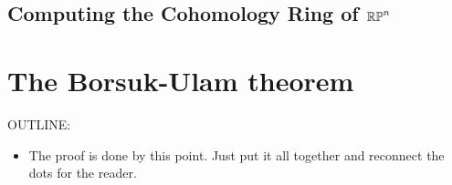 \documentclass{amsart}
\begin{document}
\subsection{Computing the Cohomology Ring of $\mathbb{RP}^n$}




\section{The Borsuk-Ulam theorem}
\label{sec:borsuk-ulam}

OUTLINE:
\begin{itemize}
\item
  The proof is done by this point. Just put it all
  together and reconnect the dots for the reader.
\end{itemize}



\nocite{shul:bfp,brunerie:thesis,br:rp-hott}

\end{document}
